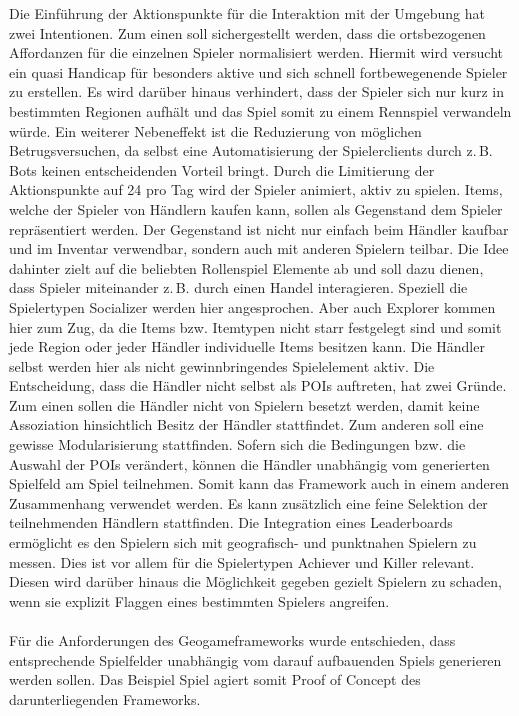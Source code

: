 Die Einführung der Aktionspunkte für die Interaktion mit der Umgebung hat zwei Intentionen. Zum einen soll sichergestellt werden, dass die ortsbezogenen Affordanzen für die einzelnen Spieler normalisiert werden. Hiermit wird versucht ein quasi Handicap für besonders aktive und sich schnell fortbewegenende Spieler zu erstellen. Es wird darüber hinaus verhindert, dass der Spieler sich nur kurz in bestimmten Regionen aufhält und das Spiel somit zu einem Rennspiel verwandeln würde.\cite{Schlieder.2005} Ein weiterer Nebeneffekt ist die Reduzierung von möglichen Betrugsversuchen, da selbst eine Automatisierung der Spielerclients durch z.\,B. Bots keinen entscheidenden Vorteil bringt.\cite{Golle.2005} Durch die Limitierung der Aktionspunkte auf 24 pro Tag wird der Spieler animiert, aktiv zu spielen. Items, welche der Spieler von Händlern kaufen kann, sollen als Gegenstand dem Spieler repräsentiert werden. Der Gegenstand ist nicht nur einfach beim Händler kaufbar und im Inventar verwendbar, sondern auch mit anderen Spielern teilbar. Die Idee dahinter zielt auf die beliebten Rollenspiel Elemente ab und soll dazu dienen, dass Spieler miteinander z.\,B. durch einen Handel interagieren. Speziell die Spielertypen Socializer werden hier angesprochen. Aber auch Explorer kommen hier zum Zug, da die Items bzw. Itemtypen nicht starr festgelegt sind und somit jede Region oder jeder Händler individuelle Items besitzen kann. Die Händler selbst werden hier als nicht gewinnbringendes Spielelement aktiv. Die Entscheidung, dass die Händler nicht selbst als POIs auftreten, hat zwei Gründe. Zum einen sollen die Händler nicht von Spielern \glqq besetzt\grqq{} werden, damit keine Assoziation hinsichtlich \glqq Besitz\grqq{} der Händler stattfindet. Zum anderen soll eine gewisse Modularisierung stattfinden. Sofern sich die Bedingungen bzw. die Auswahl der POIs verändert, können die Händler unabhängig vom generierten Spielfeld am Spiel teilnehmen. Somit kann das Framework auch in einem anderen Zusammenhang verwendet werden. Es kann zusätzlich eine feine Selektion der teilnehmenden Händlern stattfinden.
Die Integration eines Leaderboards ermöglicht es den Spielern sich mit geografisch- und punktnahen Spielern zu messen. Dies ist vor allem für die Spielertypen Achiever und Killer relevant. Diesen wird darüber hinaus die Möglichkeit gegeben gezielt Spielern zu schaden, wenn sie explizit Flaggen eines bestimmten Spielers angreifen.
\\\\
Für die Anforderungen des Geogameframeworks wurde entschieden, dass  entsprechende Spielfelder unabhängig vom darauf aufbauenden Spiels generieren werden sollen. Das Beispiel Spiel agiert somit Proof of Concept des darunterliegenden Frameworks.
